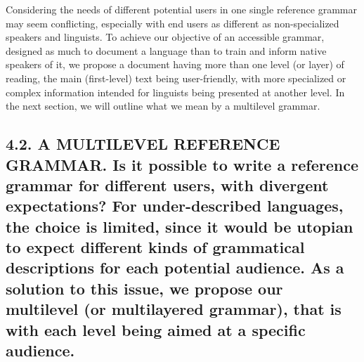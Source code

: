 \documentclass[letterpaper]{article}
\begin{document}
Considering the needs of different potential users in one single reference grammar may seem conflicting, especially with end users as different as non-specialized speakers and linguists. To achieve our objective of an accessible grammar, designed as much to document a language than to train and inform native speakers of it, we propose a document having more than one level (or layer) of reading, the main (first-level) text being user-friendly, with more specialized or complex information intended for linguists being presented at another level. In the next section, we will outline what we mean by a multilevel grammar. 

\subsection[4.2. A MULTILEVEL REFERENCE GRAMMAR. Is it possible to write a reference grammar for different users, with divergent expectations? For under{}-described languages, the choice is limited, since it would be utopian to expect different kinds of grammatical descriptions for each potential audience. As a solution to this issue, we propose our multilevel (or multilayered grammar), that is with each level being aimed at a specific audience.]{4.2. A MULTILEVEL REFERENCE GRAMMAR. \textmd{Is it possible to write a reference grammar for different users, with divergent expectations? For under}\textmd{{}-}\textmd{described languages, the choice is limited, since it would be utopi}\textmd{an}\textmd{ to expect different kinds of grammatical description}\textmd{s}\textmd{ for each potential audience. As a solution to th}\textmd{is}\textmd{ issue, we p}\textmd{ropose }\textmd{our multilevel (or multilayered grammar), that is with each level being aimed at a specific audience.}}
\end{document}

